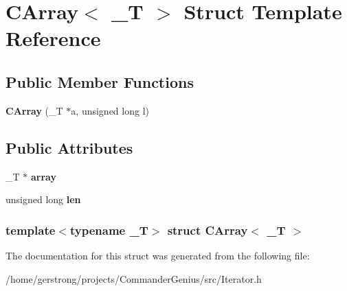 \hypertarget{struct_c_array}{
\section{CArray$<$ \_\-T $>$ Struct Template Reference}
\label{struct_c_array}
}
\subsection*{Public Member Functions}
\begin{DoxyCompactItemize}
\item 
\hypertarget{struct_c_array_aaecb11f71ef2521d98063446ed1176e4}{
{\bfseries CArray} (\_\-T $\ast$a, unsigned long l)}
\label{struct_c_array_aaecb11f71ef2521d98063446ed1176e4}

\end{DoxyCompactItemize}
\subsection*{Public Attributes}
\begin{DoxyCompactItemize}
\item 
\hypertarget{struct_c_array_ab21cb2ce9b7dbbd7c8a621ecb96e763c}{
\_\-T $\ast$ {\bfseries array}}
\label{struct_c_array_ab21cb2ce9b7dbbd7c8a621ecb96e763c}

\item 
\hypertarget{struct_c_array_ac50938eedc044cfcd9d9cacda3addc7e}{
unsigned long {\bfseries len}}
\label{struct_c_array_ac50938eedc044cfcd9d9cacda3addc7e}

\end{DoxyCompactItemize}
\subsubsection*{template$<$typename \_\-T$>$ struct CArray$<$ \_\-T $>$}



The documentation for this struct was generated from the following file:\begin{DoxyCompactItemize}
\item 
/home/gerstrong/projects/CommanderGenius/src/Iterator.h\end{DoxyCompactItemize}
